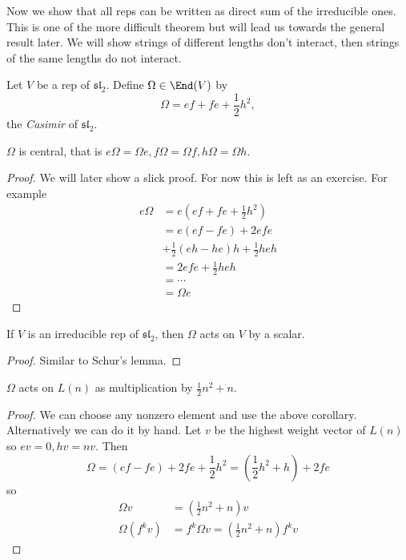 \documentclass[a4paper]{article}
\newcommand*{\Lie}[1]{\mathfrak{#1}} %
\begin{document}
Now we show that all reps can be written as direct sum of the irreducible ones. This is one of the more difficult theorem but will lead us towards the general result later. We will show strings of different lengths don't interact, then strings of the same lengths do not interact.

\begin{definition}
  Let \(V\) be a rep of \(\Lie{sl}_2\). Define \(\Omega \in \End(V)\) by
  \[
    \Omega = ef + fe + \frac{1}{2}h^2,
  \]
  the \emph{Casimir} of \(\Lie{sl}_2\).
\end{definition}

\begin{lemma}
  \(\Omega\) is central, that is \(e\Omega = \Omega e, f \Omega = \Omega f, h \Omega = \Omega h\).
\end{lemma}

\begin{proof}
  We will later show a slick proof. For now this is left as an exercise. For example
  \begin{align*}
    e \Omega
    &= e (ef +fe + \frac{1}{2} h^2) \\
    &= e(ef - fe) + 2efe \\
    &+ \frac{1}{2} (eh - he) h + \frac{1}{2} heh \\
    &= 2efe + \frac{1}{2} heh \\
    &= \cdots \\
    &= \Omega e
  \end{align*}
\end{proof}

\begin{corollary}
  If \(V\) is an irreducible rep of \(\Lie{sl}_2\), then \(\Omega\) acts on \(V\) by a scalar.
\end{corollary}

\begin{proof}
  Similar to Schur's lemma.
\end{proof}

\begin{lemma}
  \(\Omega\) acts on \(L(n)\) as multiplication by \(\frac{1}{2} n^2 + n\).
\end{lemma}

\begin{proof}
  We can choose any nonzero element and use the above corollary. Alternatively we can do it by hand. Let \(v\) be the highest weight vector of \(L(n)\) so \(ev = 0, hv = nv\). Then
  \[
    \Omega = (ef - fe) + 2fe + \frac{1}{2} h^2 = (\frac{1}{2} h^2 + h) + 2fe
  \]
  so
  \begin{align*}
    \Omega v &= (\frac{1}{2} n^2 + n) v \\
    \Omega (f^k v) &= f^k \Omega v = (\frac{1}{2} n^2 + n) f^k v
  \end{align*}
\end{proof}
\end{document}
